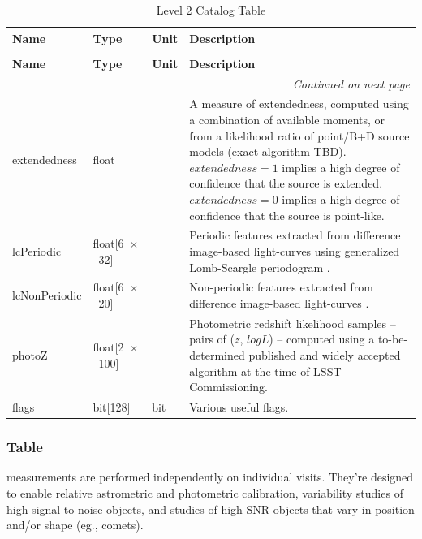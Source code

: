 \documentclass[SE,lsstdraft,toc]{lsstdoc}
\newcommand\x         {\hbox{$\times$}}
\newcommand{\marginreq}[1]{\marginpar{\hspace{0pt}\tiny #1}}
\newcommand{\dmreq}[1]{\marginreq{DMS-REQ-#1}}
\newenvironment{schema}[3]{%
\setlength\LTleft{0pt}
\setlength\LTright{\fill}
\begin{longtable}{p{0.2\textwidth}p{0.14\textwidth}p{0.14\textwidth}p{0.41\textwidth}}

\caption[#1]{#2\label{#3}}\\

\hline \textbf{Name} & \textbf{Type} & \textbf{Unit} & \textbf{Description}\\ \hline
\endfirsthead

\caption[#1]{#2}\\

\hline \textbf{Name} & \textbf{Type} & \textbf{Unit} & \textbf{Description}\\ \hline
\endhead

\hline \multicolumn{4}{r}{\emph{Continued on next page}} \\
\endfoot

\hline\hline
\endlastfoot
}{%
\hline
\end{longtable}
}
\begin{document}
\begin{schema}{\Object Table}{Level 2 Catalog \Object Table}{tbl:objectTable}
extendedness & float & ~ & A measure of extendedness, computed using a combination of available moments, or from a likelihood ratio of point/B+D source models (exact algorithm TBD). $extendedness=1$ implies a high degree of confidence that the source is extended. $extendedness=0$ implies a high degree of confidence that the source is point-like. \\

lcPeriodic & float[6~\x~32] & ~ & Periodic features extracted from difference image-based light-curves using generalized Lomb-Scargle periodogram \citep[Table~4,][]{2011ApJ...733...10R}.\\

lcNonPeriodic & float[6~\x~20] & ~ & Non-periodic features extracted from difference image-based light-curves \citep[Table~5,][]{2011ApJ...733...10R}. \\

photoZ & float[2~\x~100] & ~ & Photometric redshift likelihood samples -- pairs of ($z$, $logL$) -- computed using a to-be-determined published and widely accepted algorithm at the time of LSST Commissioning. \\

flags & bit[128] & bit & Various useful flags. \\
\end{schema}


\subsubsection{\Source Table}
\label{sec:sourceTable}

\Source measurements are performed independently on individual visits. They're designed to enable relative astrometric and photometric calibration, variability studies of high signal-to-noise objects, and studies of high SNR objects that vary in position and/or shape (eg., comets).\dmreq{0267}
\end{document}
